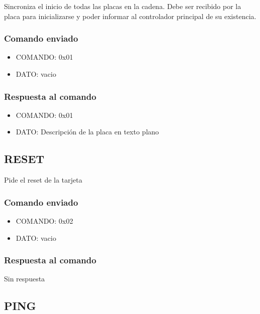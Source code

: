 \documentclass[a4paper,10pt]{article}
\begin{document}
Sincroniza el inicio de todas las placas en la cadena.
Debe ser recibido por la placa para inicializarse y poder informar al controlador principal de su existencia.

\subsubsection*{Comando enviado}
\label{init_comando_enviado}

\begin{itemize}
	\item{COMANDO:} 0x01
	\item{DATO:} vacio
\end{itemize}

\subsubsection*{Respuesta al comando}
\label{init_respuesta}

\begin{itemize}
	\item{COMANDO:} 0x01
	\item{DATO:} Descripci\'on de la placa en texto plano
\end{itemize}

\subsection{RESET}
\label{reset}

Pide el reset de la tarjeta

\subsubsection*{Comando enviado}
\label{reset_comando_enviado}

\begin{itemize}
	\item{COMANDO:} 0x02
	\item{DATO:} vacio
\end{itemize}

\subsubsection*{Respuesta al comando}
\label{reset_respuesta}

Sin respuesta

\subsection{PING}
\label{ping}
\end{document}
